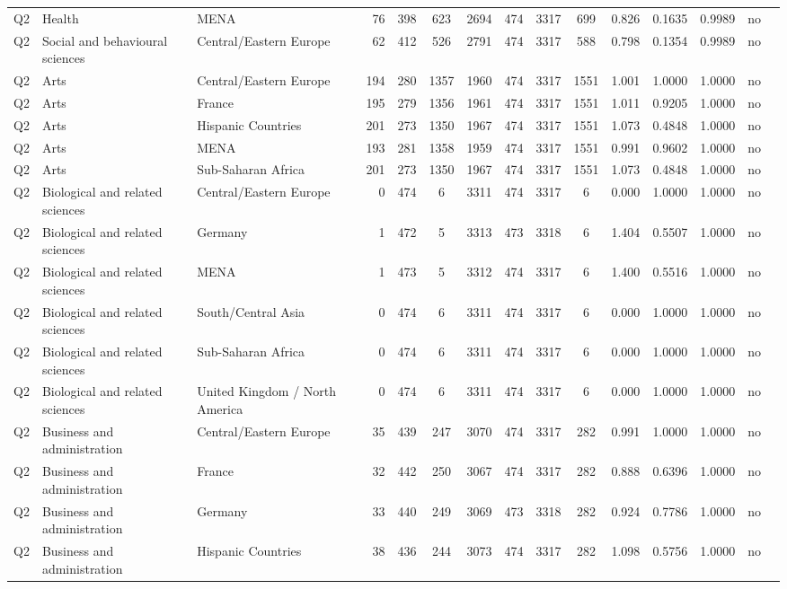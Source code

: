 \begin{longtable}{lllrcccccccccll}
Q2 & Health & MENA & 76 & 398 & 623 & 2694 & 474 & 3317 & 699 & 0.826 & 0.1635 & 0.9989 & no \\
Q2 & Social and behavioural sciences & Central/Eastern Europe & 62 & 412 & 526 & 2791 & 474 & 3317 & 588 & 0.798 & 0.1354 & 0.9989 & no \\
Q2 & Arts & Central/Eastern Europe & 194 & 280 & 1357 & 1960 & 474 & 3317 & 1551 & 1.001 & 1.0000 & 1.0000 & no \\
Q2 & Arts & France & 195 & 279 & 1356 & 1961 & 474 & 3317 & 1551 & 1.011 & 0.9205 & 1.0000 & no \\
Q2 & Arts & Hispanic Countries & 201 & 273 & 1350 & 1967 & 474 & 3317 & 1551 & 1.073 & 0.4848 & 1.0000 & no \\
Q2 & Arts & MENA & 193 & 281 & 1358 & 1959 & 474 & 3317 & 1551 & 0.991 & 0.9602 & 1.0000 & no \\
Q2 & Arts & Sub-Saharan Africa & 201 & 273 & 1350 & 1967 & 474 & 3317 & 1551 & 1.073 & 0.4848 & 1.0000 & no \\
Q2 & Biological and related sciences & Central/Eastern Europe & 0 & 474 & 6 & 3311 & 474 & 3317 & 6 & 0.000 & 1.0000 & 1.0000 & no \\
Q2 & Biological and related sciences & Germany & 1 & 472 & 5 & 3313 & 473 & 3318 & 6 & 1.404 & 0.5507 & 1.0000 & no \\
Q2 & Biological and related sciences & MENA & 1 & 473 & 5 & 3312 & 474 & 3317 & 6 & 1.400 & 0.5516 & 1.0000 & no \\
Q2 & Biological and related sciences & South/Central Asia & 0 & 474 & 6 & 3311 & 474 & 3317 & 6 & 0.000 & 1.0000 & 1.0000 & no \\
Q2 & Biological and related sciences & Sub-Saharan Africa & 0 & 474 & 6 & 3311 & 474 & 3317 & 6 & 0.000 & 1.0000 & 1.0000 & no \\
Q2 & Biological and related sciences & United Kingdom / North America & 0 & 474 & 6 & 3311 & 474 & 3317 & 6 & 0.000 & 1.0000 & 1.0000 & no \\
Q2 & Business and administration & Central/Eastern Europe & 35 & 439 & 247 & 3070 & 474 & 3317 & 282 & 0.991 & 1.0000 & 1.0000 & no \\
Q2 & Business and administration & France & 32 & 442 & 250 & 3067 & 474 & 3317 & 282 & 0.888 & 0.6396 & 1.0000 & no \\
Q2 & Business and administration & Germany & 33 & 440 & 249 & 3069 & 473 & 3318 & 282 & 0.924 & 0.7786 & 1.0000 & no \\
Q2 & Business and administration & Hispanic Countries & 38 & 436 & 244 & 3073 & 474 & 3317 & 282 & 1.098 & 0.5756 & 1.0000 & no \\

\end{longtable}

